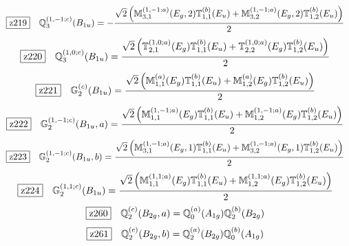 \documentclass[fleqn,10pt,landscape]{jsarticle}
\begin{document}
\begin{dmath*}
\hspace*{3mm}\fbox{z219}\quad \mathbb{Q}_{3}^{(1,-1;c)}(B_{1u})=- \frac{\sqrt{2} \left(\mathbb{M}_{3,1}^{(1,-1;a)}(E_{g},2) \mathbb{T}_{1,1}^{(b)}(E_{u}) + \mathbb{M}_{3,2}^{(1,-1;a)}(E_{g},2) \mathbb{T}_{1,2}^{(b)}(E_{u})\right)}{2}
\end{dmath*}
\begin{dmath*}
\hspace*{3mm}\fbox{z220}\quad \mathbb{Q}_{3}^{(1,0;c)}(B_{1u})=\frac{\sqrt{2} \left(\mathbb{T}_{2,1}^{(1,0;a)}(E_{g}) \mathbb{T}_{1,1}^{(b)}(E_{u}) + \mathbb{T}_{2,2}^{(1,0;a)}(E_{g}) \mathbb{T}_{1,2}^{(b)}(E_{u})\right)}{2}
\end{dmath*}
\begin{dmath*}
\hspace*{3mm}\fbox{z221}\quad \mathbb{G}_{2}^{(c)}(B_{1u})=\frac{\sqrt{2} \left(\mathbb{M}_{1,1}^{(a)}(E_{g}) \mathbb{T}_{1,1}^{(b)}(E_{u}) + \mathbb{M}_{1,2}^{(a)}(E_{g}) \mathbb{T}_{1,2}^{(b)}(E_{u})\right)}{2}
\end{dmath*}
\begin{dmath*}
\hspace*{3mm}\fbox{z222}\quad \mathbb{G}_{2}^{(1,-1;c)}(B_{1u},a)=\frac{\sqrt{2} \left(\mathbb{M}_{1,1}^{(1,-1;a)}(E_{g}) \mathbb{T}_{1,1}^{(b)}(E_{u}) + \mathbb{M}_{1,2}^{(1,-1;a)}(E_{g}) \mathbb{T}_{1,2}^{(b)}(E_{u})\right)}{2}
\end{dmath*}
\begin{dmath*}
\hspace*{3mm}\fbox{z223}\quad \mathbb{G}_{2}^{(1,-1;c)}(B_{1u},b)=\frac{\sqrt{2} \left(\mathbb{M}_{3,1}^{(1,-1;a)}(E_{g},1) \mathbb{T}_{1,1}^{(b)}(E_{u}) + \mathbb{M}_{3,2}^{(1,-1;a)}(E_{g},1) \mathbb{T}_{1,2}^{(b)}(E_{u})\right)}{2}
\end{dmath*}
\begin{dmath*}
\hspace*{3mm}\fbox{z224}\quad \mathbb{G}_{2}^{(1,1;c)}(B_{1u})=\frac{\sqrt{2} \left(\mathbb{M}_{1,1}^{(1,1;a)}(E_{g}) \mathbb{T}_{1,1}^{(b)}(E_{u}) + \mathbb{M}_{1,2}^{(1,1;a)}(E_{g}) \mathbb{T}_{1,2}^{(b)}(E_{u})\right)}{2}
\end{dmath*}
\begin{dmath*}
\hspace*{3mm}\fbox{z260}\quad \mathbb{Q}_{2}^{(c)}(B_{2g},a)=\mathbb{Q}_{0}^{(a)}(A_{1g}) \mathbb{Q}_{2}^{(b)}(B_{2g})
\end{dmath*}
\begin{dmath*}
\hspace*{3mm}\fbox{z261}\quad \mathbb{Q}_{2}^{(c)}(B_{2g},b)=\mathbb{Q}_{2}^{(a)}(B_{2g}) \mathbb{Q}_{0}^{(b)}(A_{1g})
\end{dmath*}
\end{document}
